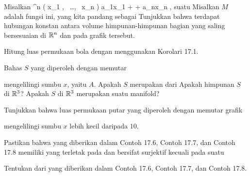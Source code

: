\setcounter{section}{17}


{}
{

Misalkan
\maabbeledisp {\varphi} {\R^n } {\R
} { \left(  x_1   , \,   \ldots  , \,   x_n                 \right) } {a_1x_1 + \cdots + a_nx_n
} {,}
suatu
Misalkan $M$ adalah
fungsi ini, yang kita pandang sebagai
Tunjukkan bahwa terdapat hubungan konstan antara volume himpunan-himpunan bagian yang saling bersesuaian di ${\mathbb R}^n$ dan pada grafik tersebut.

}
{} {}

{}
{

Hitung luas permukaan bola dengan menggunakan
Korolari 17.1.

}
{} {}

{}
{

Bahas
 $S$ yang diperoleh dengan memutar

 {  }

mengelilingi sumbu $x$, yaitu $A$. Apakah $S$ merupakan
 dari
 Apakah himpunan $S$
 di ${\mathbb R}^3$? Apakah
 $S$ di ${\mathbb R}^3$ merupakan suatu manifold?

}
{} {}

{}
{

Tunjukkan bahwa luas permukaan putar yang diperoleh dengan memutar grafik

 {  }

mengelilingi sumbu $x$ lebih kecil daripada $10$.

}
{} {}

{}
{

Pastikan bahwa
yang diberikan dalam
Contoh 17.6,
Contoh 17.7,
dan
Contoh 17.8
memiliki
yang terletak pada
dan bersifat surjektif kecuali pada suatu

}
{} {}

{}
{

Tentukan
 {} {}
dari
yang diberikan dalam
Contoh 17.6,
Contoh 17.7,
dan
Contoh 17.8.

}
{} {}

